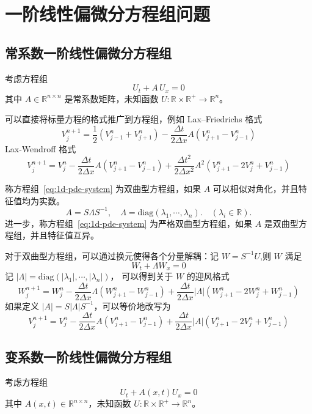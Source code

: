 \section{一阶线性偏微分方程组问题}

\subsection*{常系数一阶线性偏微分方程组}

考虑方程组
\begin{equation}
    U_t + A\, U_x = 0    \label{eq:1d-pde-system}
\end{equation}
其中 $A \in \mathbb{R}^{n \times n}$ 是常系数矩阵，未知函数 $U: \mathbb{R}\times \mathbb{R}^+ \to \mathbb{R}^n$。

可以直接将标量方程的格式推广到方程组，例如 Lax–Friedrichs 格式
\[
    V_j^{n+1} = \frac12(V_{j-1}^n + V_{j+1}^n) - \frac{\Delta t}{2\Delta x} A (V_{j+1}^n - V_{j-1}^n)
\]
Lax-Wendroff 格式
\[
    V_j^{n+1} = V_j^n - \frac{\Delta t}{2\Delta x} A (V_{j+1}^n - V_{j-1}^n)
    + \frac{\Delta t^2}{2\Delta x^2} A^2(V_{j+1}^n - 2 V_j^n + V_{j-1}^n)
\]

\begin{definition}
    称方程组~\eqref{eq:1d-pde-system} 为双曲型方程组，如果 $A$ 可以相似对角化，并且特征值均为实数。
    \[
        A = S \Lambda S^{-1},\quad
        \Lambda = \text{diag}(\lambda_1,\cdots,\lambda_n).\quad (\lambda_i \in \mathbb{R}).
    \]
    进一步，称方程组~\eqref{eq:1d-pde-system} 为严格双曲型方程组，如果 $A$ 是双曲型方程组，并且特征值互异。
\end{definition}

对于双曲型方程组，可以通过换元使得各个分量解耦：记 $W = S^{-1} U$,则 $W$ 满足
\[
    W_t + \Lambda W_x = 0
\]
记 $|\Lambda| = \text{diag}(|\lambda_1|,\cdots,|\lambda_n|)$，
可以得到关于 $W$ 的迎风格式
\[
    W_j^{n+1} = W_j^n
    - \frac{\Delta t}{2\Delta x} \Lambda (W_{j+1}^n - W_{j-1}^n)
    + \frac{\Delta t}{2\Delta x} |\Lambda|(W_{j+1}^n - 2 W_j^n + W_{j-1}^n)
\]
如果定义 $|A| = S |\Lambda| S^{-1}$，可以等价地改写为
\[
    V_j^{n+1} = V_j^n
    - \frac{\Delta t}{2\Delta x} A (V_{j+1}^n - V_{j-1}^n)
    + \frac{\Delta t}{2\Delta x} |A| (V_{j+1}^n - 2 V_j^n + V_{j-1}^n)
\]

\subsection*{变系数一阶线性偏微分方程组}

考虑方程组
\begin{equation}
    U_t + A(x,t) U_x = 0    \label{eq:1d-pde-system-var}
\end{equation}
其中 $A(x,t) \in \mathbb{R}^{n \times n}$，未知函数 $U: \mathbb{R}\times \mathbb{R}^+ \to \mathbb{R}^n$。


